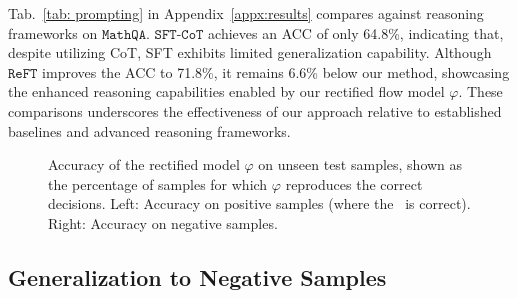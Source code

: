 Tab.~\ref{tab: prompting} in Appendix~\ref{appx:results} compares against reasoning frameworks on $\mathtt{MathQA}$. $\mathtt{SFT}$-$\mathtt{CoT}$ achieves an ACC of only 64.8\%, indicating that, despite utilizing CoT, SFT exhibits limited generalization capability. Although $\mathtt{ReFT}$ improves the ACC to 71.8\%, it remains 6.6\% below our method, showcasing the enhanced reasoning capabilities enabled by our rectified flow model $\varphi$. These comparisons underscores the effectiveness of our approach relative to established baselines and advanced reasoning frameworks.





\begin{figure}[t]
 \centering
     \vspace{-2mm}
    \caption{Accuracy of the rectified model $\varphi$ on unseen test samples, shown as the percentage of samples for which $\varphi$ reproduces the correct decisions. Left: Accuracy on positive samples (where the \rlm\ is correct). Right: Accuracy on negative samples.}
    \label{fig: rectified_flow_training}
    \vspace{-2em}
\end{figure} 

\subsection{Generalization to Negative Samples}

